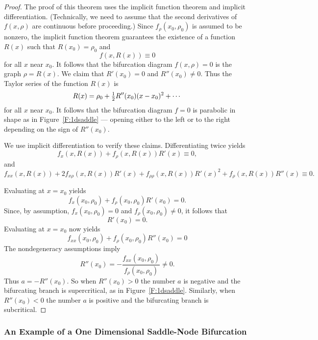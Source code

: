 \documentclass{ximera}
\begin{document}
\begin{proof}  The proof of this theorem uses the implicit function theorem and
implicit differentiation.  (Technically, we need to assume that the second
derivatives of $f(x,\rho)$ are continuous before proceeding.) Since 
$f_\rho(x_0,\rho_0)$ is assumed to be nonzero, the implicit function theorem 
guarantees the existence of a function $R(x)$ such that $R(x_0)=\rho_0$ and
\begin{equation}  \label{e:implicit0}
f(x,R(x))\equiv 0
\end{equation}
for all $x$ near $x_0$.  It follows that the bifurcation diagram $f(x,\rho)=0$
is the graph $\rho = R(x)$.  We claim that $R'(x_0)=0$ and $R''(x_0)\neq 0$. 
Thus the Taylor series of the function $R(x)$ is
\[
R(x) = \rho_0 + \mbox{$\frac{1}{2}$} R''(x_0)(x-x_0)^2 + \cdots 
\]
for all $x$ near $x_0$.  It follows that the bifurcation diagram $f=0$ is
parabolic in shape as in Figure~\ref{F:1dsaddle} --- opening either to the 
left or to the right depending on the sign of $R''(x_0)$.

We use implicit differentiation to verify these claims. Differentiating
 twice yields 
\begin{equation}  \label{e:implicit1}
f_x(x,R(x)) + f_\rho(x,R(x))R'(x) \equiv 0,
\end{equation}
and 
\begin{equation}  \label{e:implicit2}
f_{xx}(x,R(x)) + 2f_{x\rho}(x,R(x))R'(x) + f_{\rho\rho}(x,R(x))R'(x)^2 
+ f_\rho(x,R(x))R''(x) \equiv 0.
\end{equation}

Evaluating  at $x=x_0$ yields
\[
f_x(x_0,\rho_0) + f_\rho(x_0,\rho_0)R'(x_0) = 0. 
\]
Since, by assumption, $f_x(x_0,\rho_0)=0$ and $f_\rho(x_0,\rho_0)\neq 0$,
it follows that 
\[
R'(x_0)=0.
\]
Evaluating  at $x=x_0$ now yields
\[
f_{xx}(x_0,\rho_0) +  f_\rho(x_0,\rho_0)R''(x_0) = 0
\]
The nondegeneracy assumptions  imply
\[
R''(x_0) = -\frac{f_{xx}(x_0,\rho_0)}{f_\rho(x_0,\rho_0)} \neq 0.
\]
Thus $a=-R''(x_0)$.  So when $R''(x_0)>0$ the number $a$ is negative and the
bifurcating branch is supercritical, as in Figure~\ref{F:1dsaddle}.  Similarly, 
when $R''(x_0)<0$ the number $a$ is positive and the bifurcating branch is 
subcritical. \end{proof}
 
\subsubsection*{An Example of a One Dimensional Saddle-Node Bifurcation}
\end{document}
